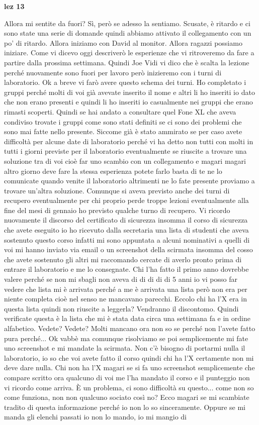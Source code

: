 {\textbf{lez 13}

Allora mi sentite da fuori? Sì, però se adesso la sentiamo. Scusate, è ritardo e ci sono state una serie di domande quindi abbiamo attivato il collegamento con un po' di ritardo. Allora iniziamo con David al monitor. Allora ragazzi possiamo iniziare. Come vi dicevo oggi descriverò le esperienze che vi ritroveremo da fare a partire dalla prossima settimana. Quindi Joe Vidi vi dico che è scalta la lezione perché nuovamente sono fuori per lavoro però inizieremo con i turni di laboratorio. Ok a breve vi farò avere questo schema dei turni. Ho completato i gruppi perché molti di voi già avevate inserito il nome e altri li ho inseriti io dato che non erano presenti e quindi li ho inseriti io casualmente nei gruppi che erano rimasti scoperti. Quindi se hai andato a consultare quel Fone XL che aveva condiviso trovate i gruppi come sono stati definiti se ci sono dei problemi che sono mai fatte nello presente. Siccome già è stato ammirato se per caso avete difficoltà per alcune date di laboratorio perché vi ha detto non tutti con molti in tutti i giorni previste per il laboratorio eventualmente se riuscite a trovare una soluzione tra di voi cioè far uno scambio con un collegamento e magari magari altro giorno deve fare la stessa esperienza potete farlo basta di te ne lo comunicate quando venite il laboratorio altrimenti ne lo fate presente proviamo a trovare un'altra soluzione. Comunque si aveva previsto anche dei turni di recupero eventualmente per chi proprio perde troppe lezioni eventualmente alla fine del mesi di gennaio ho previsto qualche turno di recupero. Vi ricordo nuovamente il discorso del certificato di sicurezza insomma il corso di sicurezza che avete eseguito io ho ricevuto dalla secretaria una lista di studenti che aveva sostenuto questo corso infatti mi sono appuntata a alcuni nominativi a quelli di voi mi hanno inviato via email o un screenshot della scirmata insomma del cosso che avete sostenuto gli altri mi raccomando cercate di averlo pronto prima di entrare il laboratorio e me lo consegnate. Chi l'ha fatto il primo anno dovrebbe valere perché se non mi sbagli non aveva di di di di di 5 anni io vi posso far vedere che lista mi è arrivata perché a me è arrivata una lista però non era per niente completa cioè nel senso ne mancavano parecchi. Eccolo chi ha l'X era in questa lista quindi non riuscite a leggerla? Vendranno il discontomo. Quindi verificate questa è la lista che mi è stata data circa una settimana fa e in ordine alfabetico. Vedete? Vedete? Molti mancano ora non so se perché non l'avete fatto pura perché... Ok vabbè ma comunque risolviamo se poi semplicemente mi fate uno screenshot e mi mandate la scirmata. Non c'è bisogno di portarmi nulla il laboratorio, io so che voi avete fatto il corso quindi chi ha l'X certamente non mi deve dare nulla. Chi non ha l'X magari se si fa uno screenshot semplicemente che compare scritto ora qualcuno di voi me l'ha mandato il corso e il punteggio non vi ricordo come arriva. È un problema, ci sono difficoltà su questo... come non so come funziona, non non qualcuno sociato così no? Ecco magari se mi scambiate tradito di questa informazione perché io non lo so sinceramente. Oppure se mi manda gli elenchi passati io non lo mando, io mi mangio di }
